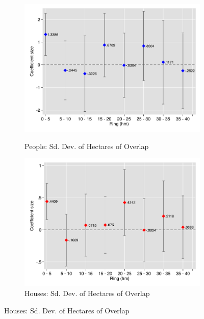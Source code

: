 \documentclass[12pt]{article}
\begin{document}
\begin{figure}[hbtp]
\begin{subfigure}[b]{.49\textwidth}
        \label{fig:gr_house}
    \end{subfigure}
        \vspace{2mm}
    \label{fig:gr_coef_sd}
    \begin{subfigure}[b]{.49\textwidth}
        \centering
        \caption[]{\small People: Sd. Dev. of Hectares of Overlap}  
        \vspace{-1mm}
        \includegraphics[width=\textwidth,trim={.2cm .2cm .2cm 0cm}, clip=true]{figures/gr_pop_sd.pdf}
        \label{fig:gr_pop_sd}
    \end{subfigure}
    \hfill
    \begin{subfigure}[b]{.49\textwidth}  
        \centering 
        \caption[]{\small Houses: Sd. Dev. of Hectares of Overlap}
        \vspace{-1mm}
        \includegraphics[width=\textwidth,trim={.2cm .2cm .2cm 0cm}, clip=true]{figures/gr_house_sd.pdf}

\end{subfigure}
\end{figure}
\end{document}
